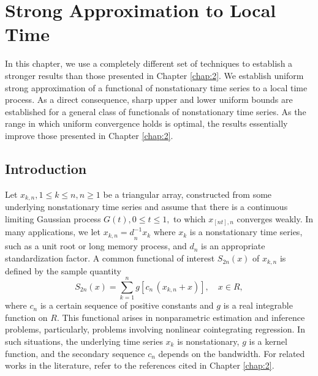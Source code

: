 \chapter{Strong Approximation to Local Time} 
\ifpdf
    \graphicspath{{Chapter3/Chapter3Figs/PNG/}{Chapter3/Chapter3Figs/PDF/}{Chapter3/Chapter3Figs/}}
\else
    \graphicspath{{Chapter3/Chapter3Figs/EPS/}{Chapter3/Chapter3Figs/}}
\fi

In this chapter, we use a completely different set of techniques to establish a stronger results than those presented in Chapter \ref{chap:2}. We establish uniform strong approximation of a functional of nonstationary time series to a local time process. As a direct consequence, sharp upper and lower uniform bounds are established for a general class of functionals of nonstationary time series. As the range in which uniform convergence holds is optimal, the results essentially improve those presented in Chapter \ref{chap:2}.

\section{Introduction}
Let ${x_{k,n},1\leq k\leq n,n\geq 1}$
 be  a triangular  array, constructed from some
underlying nonstationary time series and assume that there is a continuous
limiting Gaussian process $G(t),0\leq t\leq 1,$ to which $x_{[nt],n}$
converges weakly. In many applications, we let ${x_{k,n}=d}_{n}^{-1}{x}%
_{k}$ where $x_{k}$ is a nonstationary time series, such as a unit root or
long memory process, and $d_{n}$ is an appropriate standardization
factor. A common functional of interest $S_{2n}(x)$ of $x_{k,n}$ is defined by
the sample quantity%
\begin{equation}
S_{2n} (x)=\sum_{k=1}^{n}g[c_{n}\,(x_{k,n}+x)], \quad x\in R,
\end{equation}
where $c_{n}$ is a certain sequence of positive constants and $g$ is a real
integrable function on $R$. This functional arises in nonparametric
estimation and inference  problems, particularly, problems involving nonlinear cointegrating regression. In such situations, the underlying time series $x_{k}$ is nonstationary, $g$ is a
kernel function, and the secondary sequence $c_{n}$ depends on the bandwidth. For related works in the literature, refer to the references cited in Chapter \ref{chap:2}.


